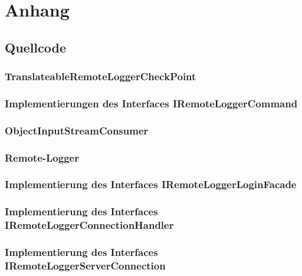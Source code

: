 \section{Anhang}
\subsection{Quellcode}
\subsubsection{TranslateableRemoteLoggerCheckPoint}\label{sec:CODE_TranslateableRemoteLoggerCheckPoint}

\newpage

\subsubsection{Implementierungen des Interfaces \glqq IRemoteLoggerCommand\grqq}\label{sec:CODE_IRemoteLoggerCommand}


\subsubsection{ObjectInputStreamConsumer}\label{sec:CODE_ObjectInputStreamConsumer}


\subsubsection{Remote-Logger}


\subsubsection{Implementierung des Interfaces \glqq IRemoteLoggerLoginFacade\grqq}\label{sec:CODE_RemoteLoggerLoginFacadeImpl}

\newpage

\subsubsection{Implementierung des Interfaces \glqq IRemoteLoggerConnectionHandler\grqq}\label{sec:CODE_RemoteLoggerConnectionHandler}

\newpage

\subsubsection{Implementierung des Interfaces \glqq IRemoteLoggerServerConnection\grqq}\label{sec:CODE_RemoteLoggerServerConnection}


